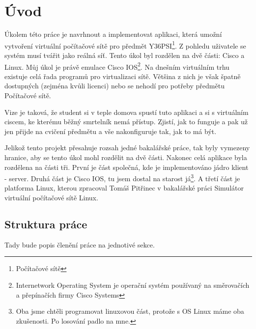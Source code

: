 \chapter{Úvod} \label{uvod}


Úkolem této práce je navrhnout a implementovat aplikaci, která umožní vytvoření virtuální počítačové sítě pro předmět Y36PSI\footnote{Počítačové sítě}. Z pohledu uživatele se systém musí tvářit jako reálná síť. Tento úkol byl rozdělen na dvě části: Cisco a Linux. Můj úkol je právě emulace Cisco IOS\footnote{Internetwork Operating System je operační systém používaný na směrovačích a přepínačích firmy Cisco Systems}. Na dnešním virtuálním trhu existuje celá řada programů pro virtualizaci sítě. Většina z nich je však špatně dostupných (zejména kvůli licenci) nebo se nehodí pro potřeby předmětu Počítačové sítě. 

Vize je taková, že student si v teple domova spustí tuto aplikaci a  si s virtuálním ciscem, ke kterému běžný smrtelník nemá přístup. Zjistí, jak to funguje a pak už jen přijde na cvičení předmětu a vše nakonfiguruje tak, jak to má být. 

Jelikož tento projekt přesahuje rozsah jedné bakalářské práce, tak byly vymezeny hranice, aby se tento úkol mohl rozdělit na dvě části. Nakonec celá aplikace byla rozdělena na části tři. První je část společná, kde je implementováno jádro klient - server. Druhá část je Cisco IOS, tu jsem dostal na starost já\footnote{Oba jsme chtěli programovat linuxovou část, protože s OS Linux máme oba zkušenosti. Po losování  padlo na mne.}. A třetí část je platforma Linux, kterou zpracoval Tomáš Pitřinec v bakalářské práci Simulátor virtuální počítačové sítě Linux.

\section{Struktura práce}
Tady bude popis členění práce na jednotivé sekce.